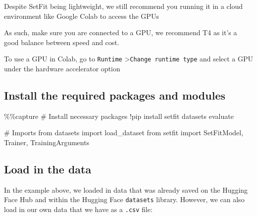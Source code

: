 \documentclass[
  letterpaper,
  DIV=11,
  numbers=noendperiod]{scrreprt}
\newenvironment{Shaded}{\begin{snugshade}}{\end{snugshade}}
\newcommand{\CommentTok}[1]{\textcolor[rgb]{0.37,0.37,0.37}{#1}}
\newcommand{\ImportTok}[1]{\textcolor[rgb]{0.00,0.46,0.62}{#1}}
\newcommand{\NormalTok}[1]{\textcolor[rgb]{0.00,0.23,0.31}{#1}}
\newcommand{\OperatorTok}[1]{\textcolor[rgb]{0.37,0.37,0.37}{#1}}
\begin{document}
Despite SetFit being lightweight, we still recommend you running it in a
cloud environment like Google Colab to access the GPUs

As such, make sure you are connected to a GPU, we recommend T4 as it's a
good balance between speed and cost.

\begin{tcolorbox}[enhanced jigsaw, opacitybacktitle=0.6, breakable, title=\textcolor{quarto-callout-tip-color}{\faLightbulb}\hspace{0.5em}{How do I do this?}, arc=.35mm, colframe=quarto-callout-tip-color-frame, colbacktitle=quarto-callout-tip-color!10!white, left=2mm, bottomrule=.15mm, opacityback=0, toprule=.15mm, bottomtitle=1mm, toptitle=1mm, titlerule=0mm, leftrule=.75mm, colback=white, rightrule=.15mm, coltitle=black]

To use a GPU in Colab, go to \texttt{Runtime}
\textgreater{}\texttt{Change\ runtime\ type} and select a GPU under the
hardware accelerator option

\end{tcolorbox}

\subsection{Install the required packages and
modules}\label{install-the-required-packages-and-modules}

\begin{Shaded}
\begin{Highlighting}[]
\OperatorTok{\%\%}\NormalTok{capture}
\CommentTok{\# Install  necessary packages}
\OperatorTok{!}\NormalTok{pip install setfit datasets evaluate}

\CommentTok{\# Imports }
\ImportTok{from}\NormalTok{ datasets }\ImportTok{import}\NormalTok{ load\_dataset}
\ImportTok{from}\NormalTok{ setfit }\ImportTok{import}\NormalTok{ SetFitModel, Trainer, TrainingArguments}
\end{Highlighting}
\end{Shaded}

\subsection{Load in the data}\label{load-in-the-data}

In the example above, we loaded in data that was already saved on the
Hugging Face Hub and within the Hugging Face \texttt{datasets} library.
However, we can also load in our own data that we have as a
\texttt{.csv} file:
\end{document}
